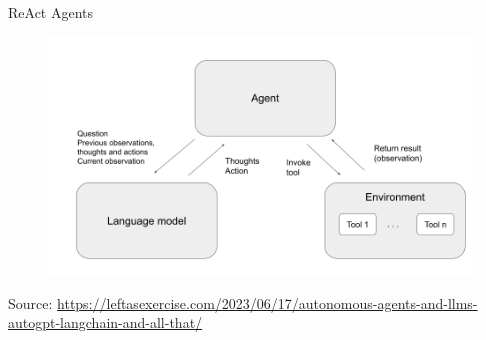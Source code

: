 \documentclass[handout]{beamer}
\begin{document}
\begin{frame}{ReAct Agents}
\scriptsize
      \begin{figure}[h]
	\includegraphics[scale = 0.3]{pics/react.png}
\end{figure}
Source: \url{https://leftasexercise.com/2023/06/17/autonomous-agents-and-llms-autogpt-langchain-and-all-that/}
\end{frame}



\end{document}
